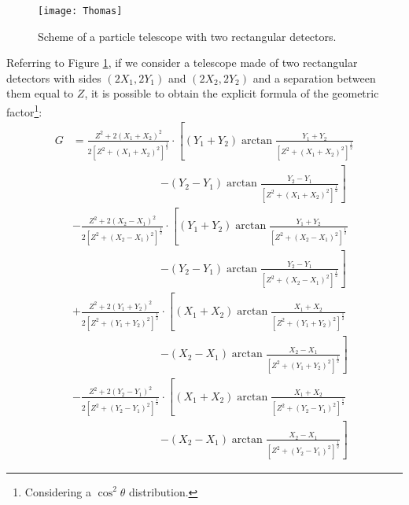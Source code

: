 \begin{figure}[!htp]
	\centering
	\texttt{[image: Thomas]}
	\caption{Scheme of a particle telescope with two rectangular detectors.}
	\label{fig:Thomas}
\end{figure}
Referring to Figure \ref{fig:Thomas}, if we consider a telescope made of two rectangular detectors with sides $(2X_1,2Y_1)$ and $(2X_2,2Y_2)$ and a separation between them equal to $Z$, it is possible to obtain the explicit formula of the geometric factor\footnote{Considering a $\cos^2\theta$ distribution.}:
\begin{align}\label{eq:Thomas}
	G & = \frac{Z^2 + 2\left( X_1+X_2\right) ^2}{2\left[ Z^2 + \left( X_1+X_2\right)^2 \right] ^{\frac{1}{2}}} \cdot \left[ \left(Y_1+Y_2\right)\arctan\frac{Y_1+Y_2}{\left[ Z^2 + \left( X_1+X_2\right)^2 \right]^{\frac{1}{2}}} \right. \nonumber \\
	& \qquad \qquad \qquad \qquad \left. - \left(Y_2-Y_1\right)\arctan\frac{Y_2-Y_1}{\left[ Z^2 + \left( X_1+X_2\right)^2 \right]^{\frac{1}{2}}}\right] \nonumber \\
	&  - \frac{Z^2 + 2\left( X_2-X_1\right) ^2}{2\left[ Z^2 + \left( X_2-X_1\right)^2 \right] ^{\frac{1}{2}}} \cdot \left[ 	\left(Y_1+Y_2\right)\arctan\frac{Y_1+Y_2}{\left[ Z^2 + \left( X_2-X_1\right)^2 \right]^{\frac{1}{2}}} \right. \nonumber \\
	& \qquad \qquad \qquad \qquad \left. - \left(Y_2-Y_1\right)\arctan\frac{Y_2-Y_1}{\left[ Z^2 + \left( X_2-X_1\right)^2 \right]^{\frac{1}{2}}}\right] \nonumber \\
	& + \frac{Z^2 + 2\left( Y_1+Y_2\right) ^2}{2\left[ Z^2 + \left( Y_1+Y_2\right)^2 \right] ^{\frac{1}{2}}} \cdot \left[ \left(X_1+X_2\right)\arctan\frac{X_1+X_2}{\left[ Z^2 + \left( Y_1+Y_2\right)^2 \right]^{\frac{1}{2}}} \right. \nonumber \\
	& \qquad \qquad \qquad \qquad \left. - \left(X_2-X_1\right)\arctan\frac{X_2-X_1}{\left[ Z^2 + \left( Y_1+Y_2\right)^2 \right]^{\frac{1}{2}}}\right] \nonumber \\
	&  - \frac{Z^2 + 2\left( Y_2-Y_1\right) ^2}{2\left[ Z^2 + \left( Y_2-Y_1\right)^2 \right] ^{\frac{1}{2}}} \cdot \left[ \left(X_1+X_2\right)\arctan\frac{X_1+X_2}{\left[ Z^2 + \left( Y_2-Y_1\right)^2 \right]^{\frac{1}{2}}} \right. \nonumber \\
	& \qquad \qquad \qquad \qquad \left. - \left(X_2-X_1\right)\arctan\frac{X_2-X_1}{\left[ Z^2 + \left( Y_2-Y_1\right)^2 \right]^{\frac{1}{2}}}\right]
\end{align}
